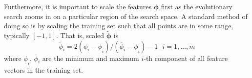 \documentclass[conference]{IEEEtran}
\renewcommand{\vec}[1]{{\mbox{\boldmath$#1$}}}
\newcommand{\inner}[2]{\big<\vec{#1}\cdot\vec{#2}\big>}
\renewcommand{\vec}[1]{{\mathbf #1}}
\begin{document}
Furthermore, it is important to scale the features $\vec{\phi}$ first as the evolutionary search zooms in on a particular region of the search space. A standard method of doing so is by scaling the training set such that all points are in some range, typically $[-1,1]$. That is, scaled $\tilde{\vec{\phi}}$ is
\begin{equation}\label{eq:scale}
\tilde \phi_i = 2 (\phi_i - \underline{\phi}_i) / (\overline{\phi}_i - \underline{\phi}_i) - 1 ~~~ i = 1,\ldots,m
\end{equation}
where $\underline{\phi}_i$, $\overline{\phi}_i$ are the minimum and maximum $i$-th component of all feature vectors in the training set. 
\end{document}
